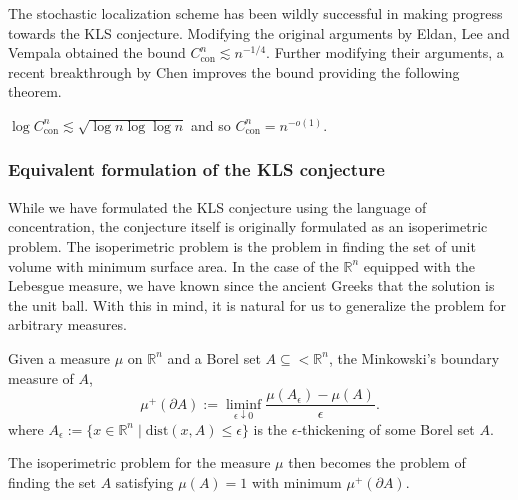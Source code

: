 
The stochastic localization scheme has been wildly successful in making progress towards the KLS conjecture. 
Modifying the original arguments by Eldan, Lee and Vempala \cite{Lee_2016} obtained the bound 
\(C_{\text{con}}^n \lesssim n^{-1 / 4}\). Further modifying their arguments, a recent breakthrough by 
Chen \cite{Chen_2020} improves the bound providing the following theorem. 

\begin{theorem}
  \(\log C_{\text{con}}^n \lesssim \sqrt{\log n \log \log n}\) and so \(C_{\text{con}}^n = n^{-o(1)}\).
\end{theorem}


\subsubsection{Equivalent formulation of the KLS conjecture}

While we have formulated the KLS conjecture using the language of concentration, the conjecture itself 
is originally formulated as an isoperimetric problem. The isoperimetric problem is the problem in finding 
the set of unit volume with minimum surface area. In the case of the \(\mathbb{R}^n\) equipped with the 
Lebesgue measure, we have known since the ancient Greeks \cite{iso_hist} that the solution is the unit ball. 
With this in mind, it is natural for us to generalize the problem for arbitrary measures. 

\begin{definition}
  Given a measure \(\mu\) on \(\mathbb{R}^n\) and a Borel set \(A \subseteq <\mathbb{R}^n\), the Minkowski's 
  boundary measure of \(A\), 
  \[\mu^+(\partial A) := \liminf_{\epsilon \downarrow 0} \frac{\mu(A_\epsilon) - \mu(A)}{\epsilon}.\]
  where \(A_\epsilon := \{x \in \mathbb{R}^n \mid \text{dist}(x, A) \le \epsilon\}\) is the 
  \(\epsilon\)-thickening of some Borel set \(A\). 
\end{definition}

The isoperimetric problem for the measure \(\mu\) then becomes the problem of finding the set \(A\) 
satisfying \(\mu(A) = 1\) with minimum \(\mu^+(\partial A)\). 

